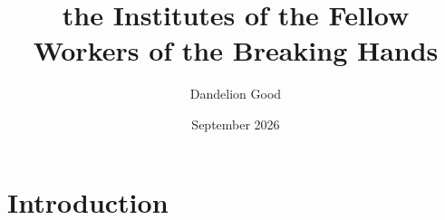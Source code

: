 \documentclass{article}
\title{the Institutes of the Fellow Workers of the Breaking Hands}
\author{Dandelion Good}
\date{September 2026}
\begin{document}
\maketitle

\section{Introduction}
\end{document}
